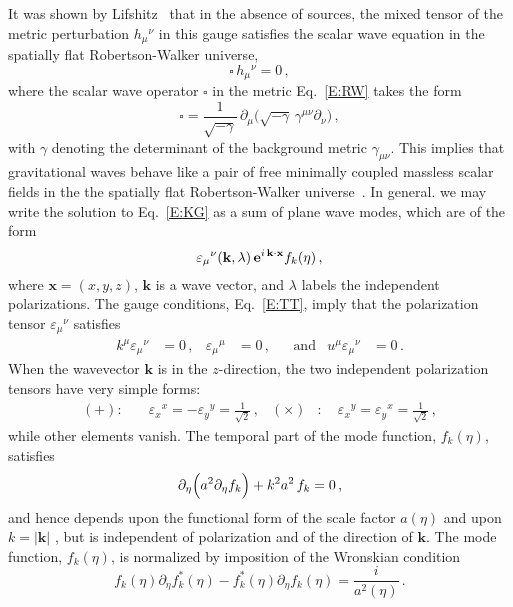 \documentclass[preprint,prd,showpacs,superscriptaddress]{revtex4}
\begin{document}
It was shown by Lifshitz~\cite{Lifshitz} that in the absence of sources, the mixed tensor of the metric perturbation 
$h_{\mu}{}^{\nu}$ in this gauge satisfies the scalar wave equation in the spatially flat Robertson-Walker universe,
\begin{equation}\label{E:KG}
	\square\,h_{\mu}{}^{\nu}=0\,,
\end{equation}
where the scalar wave operator $\square$ in the metric Eq.~\eqref{E:RW} takes the form
\begin{equation}
	\square=\frac{1}{\sqrt{-\gamma}}\,\partial_{\mu}\biggl(\sqrt{-\gamma}\,\gamma^{\mu\nu}\partial_{\nu}\biggr)\,,
	\label{E:Sbox}
\end{equation}
with $\gamma$ denoting the determinant of the background metric $\gamma_{\mu\nu}$. This  implies that gravitational 
waves behave like a pair of free minimally coupled massless scalar fields in the the spatially flat Robertson-Walker 
universe~\cite{FordParker:1977}. In general. we may write the solution to Eq.~\eqref{E:KG} as a sum of plane wave modes,
which are of the form
\begin{equation}\label{E:plane-wave}
	\varepsilon_{\mu}{}^{\nu}(\mathbf{k},\lambda)\,{\bf e}^{i\,\mathbf{k}\cdot\mathbf{x}}f_k(\eta)\,,
\end{equation}
where $\mathbf{x}=(x,y,z)$, $\mathbf{k}$ is a wave vector, and $\lambda$ labels the independent polarizations. 
The gauge conditions, Eq.~\eqref{E:TT}, imply that the polarization tensor $\varepsilon_{\mu}{}^{\nu}$ satisfies 
\begin{align}
	k^{\mu}\varepsilon_{\mu}{}^{\nu}&=0\,,&\varepsilon_{\mu}{}^{\mu}&=0\,,&&\text{and}&u^{\mu}\varepsilon_{\mu}{}^{\nu}&=0\,.
\end{align}
When the wavevector $\mathbf{k}$ is in the $z$-direction, the two independent polarization tensors have very simple forms:
\begin{align}
	(+):&\quad\varepsilon_{x}{}^{x}=-\varepsilon_{y}{}^{y}=\frac{1}{\sqrt{2}}\,,&(\times)&:\quad\varepsilon_{x}{}^{y}=
	\varepsilon_{y}{}^{x}=\frac{1}{\sqrt{2}}\,,
\end{align}
while other elements vanish. The temporal part of the mode function, $f_k(\eta)$,  satisfies
\begin{equation}\label{E:mode-eq}
	\partial_{\eta}\Bigl(a^{2}\partial_{\eta}f_k \Bigr)+k^{2}a^{2}\,f_k=0\,,
\end{equation}
and hence depends upon the functional form of the scale factor $a(\eta)$ and upon $k=|\mathbf{k}|$ , 
but is independent of polarization and of the
direction of $\mathbf{k}$. The mode function, $f_k(\eta)$,  is normalized by imposition of the Wronskian condition
\begin{equation}
	f_k(\eta) \partial_{\eta}f^{*}_k(\eta)-f^{*}_k(\eta)\partial_{\eta}f_k(\eta)=\frac{i}{a^{2}(\eta)}\,.
	\label{E:Wronskian}
\end{equation}
\end{document}
